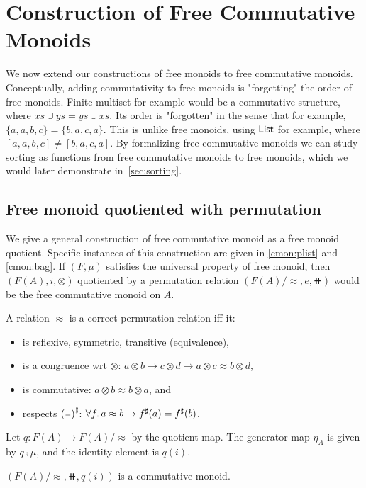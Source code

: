 \section{Construction of Free Commutative Monoids}
\label{sec:commutative-monoids}

We now extend our constructions of free monoids to free commutative monoids.
Conceptually, adding commutativity to free monoids is "forgetting" the order
of free monoids. Finite multiset for example would be a commutative structure,
where $xs \cup ys = ys \cup xs$. Its order is "forgotten" in the sense that for example,
$\{a, a, b, c\} = \{b, a, c, a\}$. This is unlike free monoids, using $\operatorname{\mathsf{List}}$ for example, 
where $[a, a, b, c] \neq [b, a, c, a]$. By formalizing free commutative monoids
we can study sorting as functions from free commutative monoids to free monoids,
which we would later demonstrate in~\cref{sec:sorting}.

\subsection{Free monoid quotiented with permutation}\label{cmon:qfreemon}
We give a general construction of free commutative monoid as a free monoid quotient.
Specific instances of this construction are given in \cref{cmon:plist} and \cref{cmon:bag}.
If $(F, \mu)$ satisfies the universal property of free monoid,
then $(F(A), i, \otimes)$ quotiented by a permutation relation $(F(A) / \approx, e, \doubleplus)$
would be the free commutative monoid on $A$.

A relation $\approx$ is a correct permutation relation iff it:
\begin{itemize}
    \item is reflexive, symmetric, transitive (equivalence),
    \item is a congruence wrt $\otimes$: $a \otimes b \to c \otimes d \to a \otimes c \approx b \otimes d$,
    \item is commutative: $a \otimes b \approx b \otimes a$, and
    \item respects ${({\scriptstyle{-}})}^{\sharp}$: $\forall f. \, a \approx b \to {f}^{\sharp}(a) = {f}^{\sharp}(b)$.
\end{itemize}

Let $q : F(A) \to F(A) / \approx$ by the quotient map.
The generator map $\eta_A$ is given by $q \comp \mu$, and the identity element is $q(i)$.

\begin{proposition}
$(F(A) / \approx, \doubleplus, q(i))$ is a commutative monoid.
\end{proposition}


